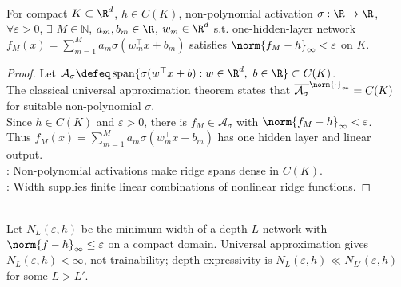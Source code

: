 \begin{theorem} \label{thm:sl-universal-approximation-form} \\
For compact $K\subset\R^d$, $h\in C(K)$, non-polynomial activation $\sigma:\R\to\R$, $\forall \varepsilon>0$, $\exists$ $M\in\mathbb{N}$, $a_m,b_m\in\R$, $w_m\in\R^d$ s.t. one-hidden-layer network $f_M(x)=\sum\limits_{m=1}^M a_m\sigma(w_m^\top x+b_m)$ satisfies $\norm{f_M-h}_\infty<\varepsilon$ on $K$.
\begin{proof} Let $\mathcal{A}_\sigma\defeq\operatorname{span}\{\sigma(w^\top x+b):w\in\R^d,\ b\in\R\}\subset C(K)$.\\
The classical universal approximation theorem states that $\overline{\mathcal{A}_\sigma}^{\norm{\cdot}_\infty}=C(K)$ for suitable non-polynomial $\sigma$.\\
Since $h\in C(K)$ and $\varepsilon>0$, there is $f_M\in\mathcal{A}_\sigma$ with $\norm{f_M-h}_\infty<\varepsilon$.\\
Thus $f_M(x)=\sum\limits_{m=1}^M a_m\sigma(w_m^\top x+b_m)$ has one hidden layer and linear output.\\
: Non-polynomial activations make ridge spans dense in $C(K)$.\\
: Width supplies finite linear combinations of nonlinear ridge functions.
\end{proof}
\end{theorem}

\begin{remark} \label{rem:sl-depth-expressivity} \\
Let $N_L(\varepsilon,h)$ be the minimum width of a depth-$L$ network with $\norm{f-h}_\infty\le\varepsilon$ on a compact domain. Universal approximation gives $N_L(\varepsilon,h)<\infty$, not trainability; depth expressivity is $N_L(\varepsilon,h)\ll N_{L'}(\varepsilon,h)$ for some $L>L'$.
\end{remark}
